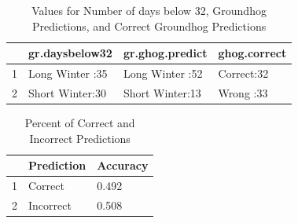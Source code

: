 \documentclass[12pt]{article}\usepackage[]{graphicx}\usepackage[]{color}
\begin{document}
\newpage
\begin{table}[ht]
\centering
\begin{tabular}{rlll}
  \hline
 &      gr.daysbelow32 &     gr.ghog.predict &  ghog.correct \\ 
  \hline
1 & Long Winter :35   & Long Winter :52   & Correct:32   \\ 
  2 & Short Winter:30   & Short Winter:13   & Wrong  :33   \\ 
   \hline
\end{tabular}
\caption{Values for Number of days below 32, Groundhog Predictions, and Correct Groundhog Predictions} 
\end{table}
\begin{table}[ht]
\centering
\begin{tabular}{rll}
  \hline
 & Prediction & Accuracy \\ 
  \hline
1 & Correct & 0.492 \\ 
  2 & Incorrect & 0.508 \\ 
   \hline
\end{tabular}
\caption{Percent of Correct and Incorrect Predictions} 
\end{table}



 
 
 
\end{document}
